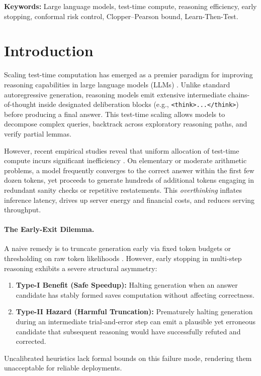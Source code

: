 \documentclass[11pt]{article}
\begin{document}
\vspace{0.5em}
\noindent\textbf{Keywords:} Large language models, test-time compute, reasoning efficiency, early stopping, conformal risk control, Clopper--Pearson bound, Learn-Then-Test.

\section{Introduction}
\label{sec:intro}

Scaling test-time computation has emerged as a premier paradigm for improving reasoning capabilities in large language models (LLMs) \citep{wei2022cot,snell2024scaling,openai2024o1,deepseek2025r1}. Unlike standard autoregressive generation, reasoning models emit extensive intermediate chains-of-thought inside designated deliberation blocks (e.g., \texttt{<think>...</think>}) before producing a final answer. This test-time scaling allows models to decompose complex queries, backtrack across exploratory reasoning paths, and verify partial lemmas.

However, recent empirical studies reveal that uniform allocation of test-time compute incurs significant inefficiency \citep{chen2024think,fan2025overthinking}. On elementary or moderate arithmetic problems, a model frequently converges to the correct answer within the first few dozen tokens, yet proceeds to generate hundreds of additional tokens engaging in redundant sanity checks or repetitive restatements. This \emph{overthinking} inflates inference latency, drives up server energy and financial costs, and reduces serving throughput.

\paragraph{The Early-Exit Dilemma.}
A naive remedy is to truncate generation early via fixed token budgets or thresholding on raw token likelihoods \citep{han2024tokenbudget}. However, early stopping in multi-step reasoning exhibits a severe structural asymmetry:
\begin{enumerate}
  \item \textbf{Type-I Benefit (Safe Speedup):} Halting generation when an answer candidate has stably formed saves computation without affecting correctness.
  \item \textbf{Type-II Hazard (Harmful Truncation):} Prematurely halting generation during an intermediate trial-and-error step can emit a plausible yet erroneous candidate that subsequent reasoning would have successfully refuted and corrected.
\end{enumerate}
Uncalibrated heuristics lack formal bounds on this failure mode, rendering them unacceptable for reliable deployments.
\end{document}
